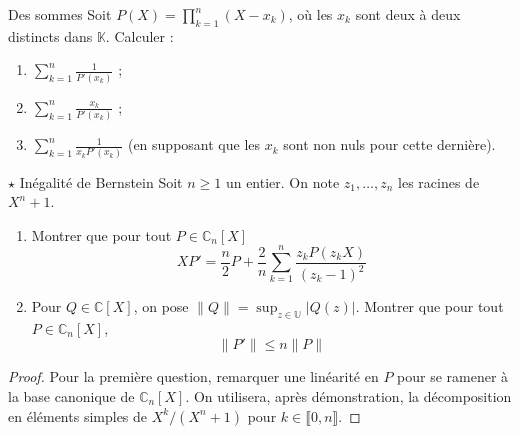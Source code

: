 \documentclass[french,a4paper]{article}
\newcommand{\C}{\mathbb{C}}
\newcommand{\K}{\mathbb{K}}
\newcommand{\U}{\mathbb{U}}
\theoremstyle{plain}
\theoremstyle{definition}
\theoremstyle{remark}
\begin{document}
\begin{ex}{Des sommes}
	Soit $P(X)=\displaystyle\prod_{k=1}^{n}(X-x_k)$, où les $x_k$ sont deux à deux distincts dans $\K$. Calculer : 
	\begin{enumerate}
		\item $\displaystyle\sum_{k=1}^{n}\frac{1}{P'(x_k)}$ ;
		\item $\displaystyle\sum_{k=1}^{n}\frac{x_k}{P'(x_k)}$ ;
		\item $\displaystyle\sum_{k=1}^{n}\frac{1}{x_kP'(x_k)}$ (en supposant que les $x_k$ sont non nuls pour cette dernière).
	\end{enumerate}
\end{ex}

\begin{ex}{$\star$ Inégalité de Bernstein}
	Soit $n\geqslant 1$ un entier. On note $z_1,\ldots,z_n$ les racines de $X^n+1$.
	\begin{enumerate}
		\item Montrer que pour tout $P\in\C_n[X]$ $$XP'=\frac{n}{2}P+\frac{2}{n}\sum_{k=1}^{n}\frac{z_kP(z_kX)}{(z_k-1)^2}$$
		\item Pour $Q\in\C[X]$, on pose $\lVert Q\rVert=\displaystyle\sup_{z\in\U}\lvert Q(z)\rvert$. Montrer que pour tout $P\in\C_n[X]$, $$\lVert P'\rVert\leqslant n\lVert P\rVert$$
	\end{enumerate}
\end{ex}
\begin{proof}
	Pour la première question, remarquer une linéarité en $P$ pour se ramener à la base canonique de $\C_n[X]$. On utilisera, après démonstration, la décomposition en éléments simples de $X^k/(X^n+1)$ pour $k\in\llbracket 0,n\rrbracket$.
\end{proof}
\end{document}
